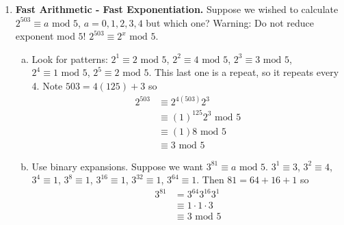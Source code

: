 \documentclass[class=article, crop=false]{standalone}
\begin{document}
\begin{enumerate}[1.]
	\item \textbf{Fast Arithmetic - Fast Exponentiation.} Suppose we wished to calculate $2^{503}\equiv a\mbox{ mod }5$,
	$a=0,1,2,3,4$ but which one? 
	{\color{red} Warning:} Do not reduce exponent mod $5$! $2^{503}\equiv 2^x \mbox{ mod }5$.
	\begin{enumerate}[(a)]
		\item Look for patterns: $2^1 \equiv 2\mbox{ mod }5$, $2^2\equiv 4\mbox{ mod }5$, $2^3\equiv 3\mbox{ mod }5$,
		$2^4\equiv 1\mbox{ mod }5$, $2^5\equiv 2\mbox{ mod }5$. This last one is a repeat, so it repeats
		every 4. Note $503=4(125)+3$ so 
		\begin{align*}
			2^{503} &\equiv2^{4(503)}2^3\\
			&\equiv (1)^{125} 2^3\mbox{ mod }5\\
			&\equiv (1) 8 \mbox{ mod }5\\
			&\equiv 3\mbox{ mod }5
		\end{align*}
		\item Use binary expansions. Suppose we want $3^{81}\equiv a\mbox{ mod }5$.
		$3^1\equiv 3$, $3^2\equiv 4$, $3^4\equiv 1$, $3^8\equiv 1$, $3^{16}\equiv 1$,
		$3^{32}\equiv 1$, $3^{64}\equiv 1$. Then $81=64+16+1$ so 
		\begin{align*}
			3^{81}&=3^{64}3^{16}3^1 \\
			&\equiv 1\cdot 1\cdot 3 \\
			&\equiv 3\mbox{ mod }5
		\end{align*}
	\end{enumerate}
\end{enumerate}

\end{document}
